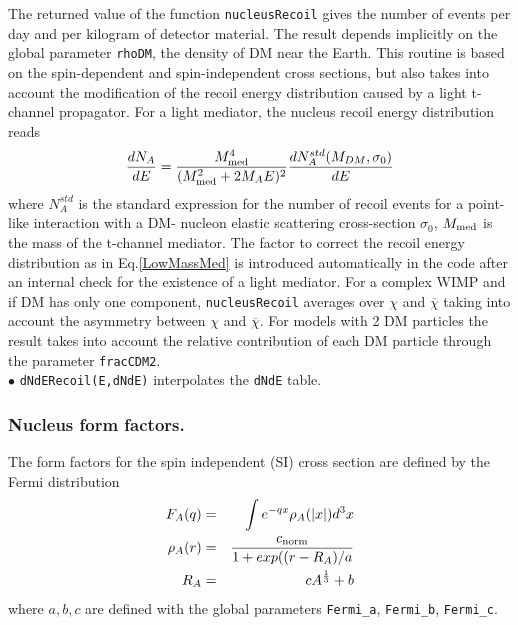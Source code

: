 \documentclass[12pt,a4paper]{article}
\begin{document}
The returned value of the function {\tt nucleusRecoil} gives the number of events per day and per kilogram of 
detector material. The  result depends  implicitly on the  global  parameter \verb|rhoDM|, the
density of DM near the Earth.
This routine is  based on the spin-dependent and spin-independent cross sections, but also
takes into account the modification of the recoil energy distribution caused  by a  light t- channel propagator.
For a light mediator, the nucleus recoil energy distribution  reads
\begin{equation}
\label{LowMassMed}
\frac{dN_{A}}{dE} = \frac{ M_{\rm med}^4}{(M_{\rm med}^2 +2 M_{A} E)^2}
\frac{dN_{A}^{std}(M_{DM},\sigma_0)}{dE} 
\end{equation}
where $N_{A}^{std}$ is the standard expression for the number of recoil events for a point-like interaction with a DM- nucleon elastic scattering cross-section $\sigma_0$, $M_{\rm med}$ is the mass of the t-channel mediator. The factor to correct the  recoil energy distribution as in Eq.\ref{LowMassMed}  is introduced automatically in the code after an internal check for  the existence of a light
mediator. For a complex WIMP and if DM has only one
component, \verb|nucleusRecoil| averages over $\chi$ and
$\overline{\chi}$ taking into account  the asymmetry between $\chi$ and $\overline{\chi}$. For models with 2 DM particles  the result takes into  account the relative contribution of each DM particle through the
parameter {\tt fracCDM2}.\\



\noindent $\bullet$ \verb|dNdERecoil(E,dNdE)| interpolates the {\tt dNdE} table.

\subsubsection{Nucleus form factors.}
\label{Nucleus_form_factors}
The form factors for the spin independent (SI) cross section are defined by the Fermi distribution
\begin{eqnarray}
F_A(q)&=&\int e^{-qx}\rho_A(|x|)d^3x\\
\rho_A(r)&=&\frac{c_{\rm{norm}}}{ 1+ exp((r-R_A)/a}\\
R_A&=& c A^{\frac{1}{3}} +b
\end{eqnarray}
where $a,b,c$ are defined with  the global parameters \verb|Fermi_a|, \verb|Fermi_b|,
\verb|Fermi_c|. 
\end{document}
